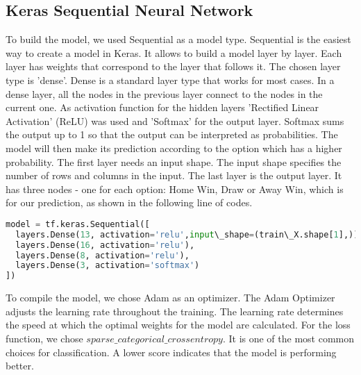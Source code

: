 \subsection{Keras Sequential Neural Network}

To build the model, we used Sequential as a model type. Sequential is the easiest way to create a model in Keras. It allows to build a model layer by layer. Each layer has weights that correspond to the layer that follows it.\newline%
The chosen layer type is 'dense'. Dense is a standard layer type that works for most cases. In a dense layer, all the nodes in the previous layer connect to the nodes in the current one.\newline
As activation function for the hidden layers 'Rectified Linear Activation' (ReLU) was used and 'Softmax' for the output layer. Softmax sums the output up to 1 so that the output can be interpreted as probabilities. The model will then make its prediction according to the option which has a higher probability.\newline \newline
The first layer needs an input shape. The input shape specifies the number of rows and columns in the input.\newline
The last layer is the output layer. It has three nodes - one for each option: Home Win, Draw or Away Win, which is for our prediction, as shown in the following line of codes.\newline \newline
\begin{lstlisting}[language=Python, caption=Python code for simple Keras Sequantial Model Instantiation]
model = tf.keras.Sequential([ 
  layers.Dense(13, activation='relu',input\_shape=(train\_X.shape[1],)), 
  layers.Dense(16, activation='relu'),
  layers.Dense(8, activation='relu'),
  layers.Dense(3, activation='softmax')
])
\end{lstlisting}
To compile the model, we chose Adam as an optimizer. The Adam Optimizer adjusts the learning rate throughout the training.\newline
The learning rate determines the speed at which the optimal weights for the model are calculated.\newline
For the loss function, we chose $sparse\_categorical\_crossentropy$. It is one of the most common choices for classification. A lower score indicates that the model is performing better.\newline \newline
